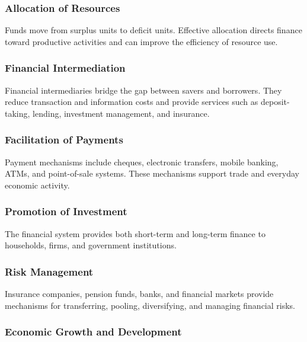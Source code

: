 \documentclass[
]{article}
\begin{document}
\subsubsection{Allocation of Resources}\label{allocation-of-resources}

Funds move from surplus units to deficit units. Effective allocation directs finance toward productive activities and can improve the efficiency of resource use.

\subsubsection{Financial Intermediation}\label{financial-intermediation}

Financial intermediaries bridge the gap between savers and borrowers. They reduce transaction and information costs and provide services such as deposit-taking, lending, investment management, and insurance.

\subsubsection{Facilitation of Payments}\label{facilitation-of-payments}

Payment mechanisms include cheques, electronic transfers, mobile banking, ATMs, and point-of-sale systems. These mechanisms support trade and everyday economic activity.

\subsubsection{Promotion of Investment}\label{promotion-of-investment}

The financial system provides both short-term and long-term finance to households, firms, and government institutions.

\subsubsection{Risk Management}\label{risk-management}

Insurance companies, pension funds, banks, and financial markets provide mechanisms for transferring, pooling, diversifying, and managing financial risks.

\subsubsection{Economic Growth and Development}\label{economic-growth-and-development}
\end{document}
